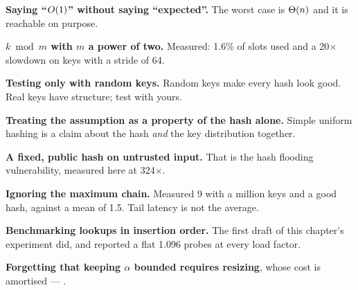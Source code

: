 \begin{pitfall}
\begin{tight}
  \item \textbf{Saying ``$O(1)$'' without saying ``expected''.} The worst
        case is $\Theta(n)$ and it is reachable on purpose.
  \item \textbf{$k \bmod m$ with $m$ a power of two.} Measured: 1.6\% of slots
        used and a 20$\times$ slowdown on keys with a stride of 64.
  \item \textbf{Testing only with random keys.} Random keys make every hash
        look good. Real keys have structure; test with yours.
  \item \textbf{Treating the assumption as a property of the hash alone.}
        Simple uniform hashing is a claim about the hash \emph{and} the key
        distribution together.
  \item \textbf{A fixed, public hash on untrusted input.} That is the hash
        flooding vulnerability, measured here at 324$\times$.
  \item \textbf{Ignoring the maximum chain.} Measured 9 with a million keys and
        a good hash, against a mean of 1.5. Tail latency is not the average.
  \item \textbf{Benchmarking lookups in insertion order.} The first draft of
        this chapter's experiment did, and reported a flat 1.096 probes at
        every load factor.
  \item \textbf{Forgetting that keeping $\alpha$ bounded requires resizing},
        whose cost is amortised --- .
\end{tight}
\end{pitfall}

